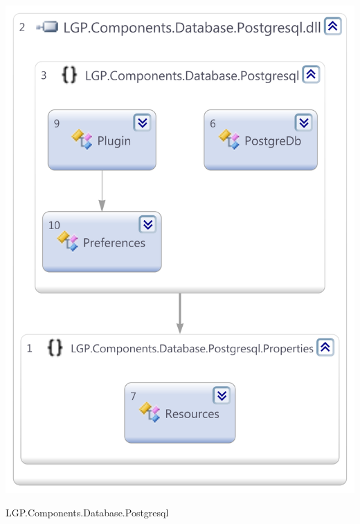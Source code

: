 \begin{multicols}{2}
			\begin{figurehere}
				\centering
				\includegraphics[scale=0.35]{pages/appendix3/figures/dllscreens/postgresql.png}
				\caption{LGP.Components.Database.Postgresql}
			\end{figurehere}
		
	\end{multicols}
	
			
\newpage	
	
